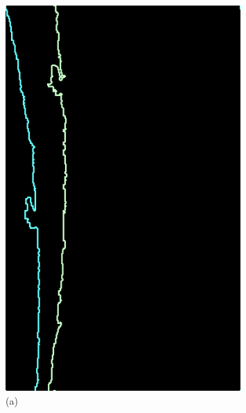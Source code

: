 \begin{figure}[H]
    \centering
    \begin{minipage}{0.49\textwidth}
        \centering
        \includegraphics[width=0.8\textwidth]{images/before_match.png} %
        \caption*{(a)} 
    \end{minipage}\hfill
    \begin{minipage}{0.49\textwidth}
        \centering

\end{minipage}
\end{figure}
